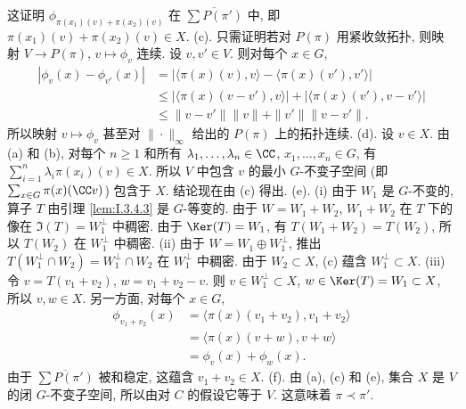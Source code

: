 \begin{solution}
\[\]
这证明 $\phi_{\pi(x_1)(v) + \pi(x_2)(v)}$ 在 $\overline{\sum P(\pi')}$ 中, 即 $\pi(x_1)(v) + \pi(x_2)(v) \in X$.
(c). 只需证明若对 $P(\pi)$ 用紧收敛拓扑, 则映射 $V \to P(\pi)$, $v \longmapsto \phi_v$ 连续. 设 $v, v' \in V$. 则对每个 $x \in G$,
\begin{align*}
|\phi_v(x) - \phi_{v'}(x)| &= |\langle \pi(x)(v), v \rangle - \langle \pi(x)(v'), v' \rangle| \\
&\leq |\langle \pi(x)(v - v'), v \rangle| + |\langle \pi(x)(v'), v - v' \rangle| \\
&\leq \|v - v'\|\|v\| + \|v'\|\|v - v'\|.
\end{align*}
所以映射 $v \longmapsto \phi_v$ 甚至对 $\|\cdot\|_{\infty}$ 给出的 $P(\pi)$ 上的拓扑连续.
(d). 设 $v \in X$. 由 (a) 和 (b), 对每个 $n \geq 1$ 和所有 $\lambda_1, \ldots, \lambda_n \in \CC$, $x_1, \ldots, x_n \in G$, 有 $\sum_{i=1}^n\lambda_i\pi(x_i)(v) \in X$. 所以 $V$ 中包含 $v$ 的最小 $G$-不变子空间 (即 $\sum_{x \in G}\pi(x)(\CC v)$) 包含于 $X$. 结论现在由 (c) 得出.
(e). (i) 由于 $W_1$ 是 $G$-不变的, 算子 $T$ 由引理 \ref{lem:I.3.4.3} 是 $G$-等变的. 由于 $W = W_1 + W_2$, $W_1 + W_2$ 在 $T$ 下的像在 $\Im(T) = W_1^{\perp}$ 中稠密. 由于 $\Ker(T) = W_1$, 有 $T(W_1 + W_2) = T(W_2)$, 所以 $T(W_2)$ 在 $W_1^{\perp}$ 中稠密.
(ii) 由于 $W = W_1 \oplus W_1^{\perp}$, 推出 $T(W_1^{\perp} \cap W_2) = W_1^{\perp} \cap W_2$ 在 $W_1^{\perp}$ 中稠密. 由于 $W_2 \subset X$, (c) 蕴含 $W_1^{\perp} \subset X$.
(iii) 令 $v = T(v_1 + v_2)$, $w = v_1 + v_2 - v$. 则 $v \in W_1^{\perp} \subset X$, $w \in \Ker(T) = W_1 \subset X$, 所以 $v, w \in X$. 另一方面, 对每个 $x \in G$,
\begin{align*}
\phi_{v_1 + v_2}(x) &= \langle \pi(x)(v_1 + v_2), v_1 + v_2 \rangle \\
&= \langle \pi(x)(v + w), v + w \rangle \\
&= \phi_v(x) + \phi_w(x).
\end{align*}
由于 $\overline{\sum P(\pi')}$ 被和稳定, 这蕴含 $v_1 + v_2 \in X$.
(f). 由 (a), (c) 和 (e), 集合 $X$ 是 $V$ 的闭 $G$-不变子空间, 所以由对 $C$ 的假设它等于 $V$. 这意味着 $\pi \prec \pi'$.
\end{solution}


